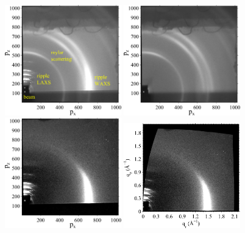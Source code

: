 \begin{figure}[htbp]
  \centering
  \includegraphics[width=0.45\textwidth]{figures/ripple/nGIWAXS/ripple_060}
  \includegraphics[width=0.45\textwidth]{figures/ripple/nGIWAXS/ripple_061}
  \includegraphics[width=0.45\textwidth]{figures/ripple/nGIWAXS/ripple_060_ccd}
  \includegraphics[width=0.45\textwidth]{figures/ripple/nGIWAXS/ripple_060_q}

\end{figure}
